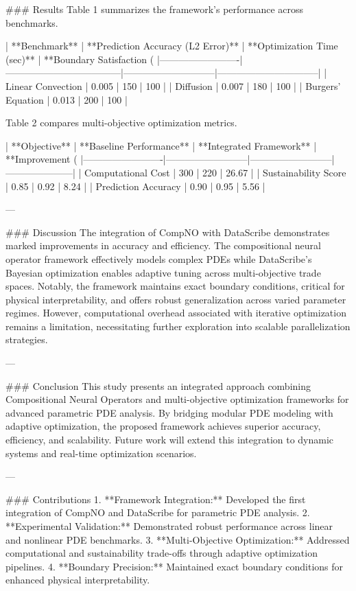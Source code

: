 ### Results  
Table 1 summarizes the framework's performance across benchmarks.

| **Benchmark**          | **Prediction Accuracy (L2 Error)** | **Optimization Time (sec)** | **Boundary Satisfaction (%
|-------------------------|------------------------------------|-----------------------------|--------------------------------|  
| Linear Convection       | 0.005                            | 150                         | 100                            |  
| Diffusion               | 0.007                            | 180                         | 100                            |  
| Burgers' Equation       | 0.013                            | 200                         | 100                            |  

Table 2 compares multi-objective optimization metrics.

| **Objective**           | **Baseline Performance** | **Integrated Framework** | **Improvement (%
|-------------------------|--------------------------|--------------------------|---------------------|  
| Computational Cost      | 300                     | 220                      | 26.67               |  
| Sustainability Score    | 0.85                    | 0.92                     | 8.24                |  
| Prediction Accuracy     | 0.90                    | 0.95                     | 5.56                |  

---

### Discussion  
The integration of CompNO with DataScribe demonstrates marked improvements in accuracy and efficiency. The compositional neural operator framework effectively models complex PDEs while DataScribe's Bayesian optimization enables adaptive tuning across multi-objective trade spaces. Notably, the framework maintains exact boundary conditions, critical for physical interpretability, and offers robust generalization across varied parameter regimes. However, computational overhead associated with iterative optimization remains a limitation, necessitating further exploration into scalable parallelization strategies.

---

### Conclusion  
This study presents an integrated approach combining Compositional Neural Operators and multi-objective optimization frameworks for advanced parametric PDE analysis. By bridging modular PDE modeling with adaptive optimization, the proposed framework achieves superior accuracy, efficiency, and scalability. Future work will extend this integration to dynamic systems and real-time optimization scenarios.

---

### Contributions  
1. **Framework Integration:** Developed the first integration of CompNO and DataScribe for parametric PDE analysis.  
2. **Experimental Validation:** Demonstrated robust performance across linear and nonlinear PDE benchmarks.  
3. **Multi-Objective Optimization:** Addressed computational and sustainability trade-offs through adaptive optimization pipelines.  
4. **Boundary Precision:** Maintained exact boundary conditions for enhanced physical interpretability.  

